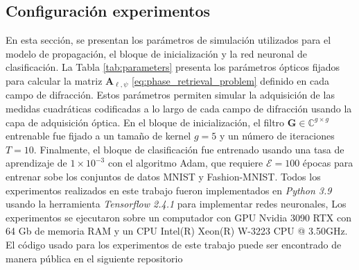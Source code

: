\subsection{Configuración experimentos}

En esta sección, se presentan los parámetros de simulación utilizados para el modelo de propagación, el bloque de inicialización y la red neuronal de clasificación. La Tabla \ref{tab:parameters} presenta los parámetros ópticos fijados para calcular la matriz $\mathbf{A}_{\ell,\psi}$ \eqref{eq:phase_retrieval_problem} definido en cada campo de difracción. Estos parámetros permiten simular la adquisición de las medidas cuadráticas codificadas a lo largo de cada campo de difracción usando la capa de adquisición óptica. En el bloque de inicialización, el filtro $\mathbf{G} \in \mathbb{C}^{g\times g}$ entrenable fue fijado a un tamaño de kernel $g=5$ y un número de iteraciones $T=10$. Finalmente, el bloque de clasificación fue entrenado usando una tasa de aprendizaje de $1\times 10^{-3}$ con el algoritmo Adam, que requiere $\mathcal{E}=100$ épocas para entrenar sobe los conjuntos de datos MNIST y Fashion-MNIST. Todos los experimentos realizados en este trabajo fueron implementados en \textit{Python 3.9} usando la herramienta \textit{Tensorflow 2.4.1}   para implementar redes neuronales, Los experimentos se ejecutaron sobre un computador con GPU Nvidia 3090 RTX con 64 Gb de memoria RAM y un CPU Intel(R) Xeon(R) W-3223 CPU @ 3.50GHz. El código usado para los experimentos de este trabajo puede ser encontrado de manera pública en el siguiente repositorio 

\begin{table}[!h]
\centering{}

\caption{ Parámetros de propagación usados para simular el modelo de propagación de la ecuación \eqref{eq:phase_retrieval_problem} para cada campo de difracción.}\label{tab:parameters}
\end{table}


